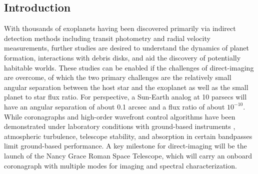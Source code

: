 \documentclass[12pt]{spieman}  %
\begin{document}
\begin{spacing}{2}   %

\section{Introduction}
\label{sec:intro}
With thousands of exoplanets having been discovered primarily via indirect detection methods including transit photometry and radial velocity measurements, further studies are desired to understand the dynamics of planet formation, interactions with debris disks, and aid the discovery of potentially habitable worlds. These studies can be enabled if the challenges of direct-imaging are overcome, of which the two primary challenges are the relatively small angular separation between the host star and the exoplanet as well as the small planet to star flux ratio. For perspective, a Sun-Earth analog at 10 parsecs will have an angular separation of about 0.1 arcsec and a flux ratio of about $10^{-10}$\cite{woolf-earth-like-contrast-1998}. While coronagraphs and high-order wavefront control algorithms have been demonstrated under laboratory conditions with ground-based instruments \cite{potier-vlt-sphere-efc}\cite{ahn-combining-efc-ldfc}, atmospheric turbulence, telescope stability, and absorption in certain bandpasses limit ground-based performance. A key milestone for direct-imaging will be the launch of the Nancy Grace Roman Space Telescope, which will carry an onboard coronagraph with multiple modes for imaging and spectral characterization\cite{noecker-wfirst-afta-2016}. 


\end{spacing}
\end{document}

